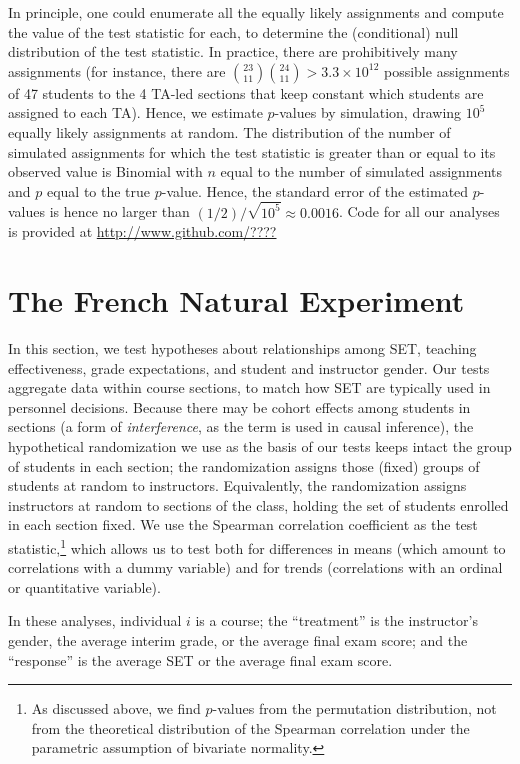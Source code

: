 \documentclass[12pt]{article}
\newcommand{\todo}[1]{{\color{red}{TO DO: \sc #1}}}
\begin{document}
In principle, one could enumerate all the equally likely assignments and compute the value
of the test statistic for each, to determine the (conditional) null distribution of the test
statistic.
In practice, there are prohibitively many assignments
(for instance, there are ${{23}\choose{11}}{{24}\choose{11}} > 3.3\times 10^{12}$ 
possible assignments
of 47 students to the 4 TA-led sections that keep constant which
students are assigned to each TA).
Hence, we estimate $p$-values by simulation, drawing $10^5$ equally likely assignments
at random.
The distribution of the number of simulated assignments for which the test statistic
is greater than or equal to its observed value is Binomial with $n$ equal to the number of
simulated assignments and $p$ equal to the true $p$-value.
Hence, the standard error of the estimated $p$-values is hence no larger than 
$(1/2)/ \sqrt{10^5}
\approx 0.0016$.
Code for all our analyses is provided at \url{http://www.github.com/????} \todo{Fix!}

\section{The French Natural Experiment}
In this section, we test hypotheses about relationships among
SET, teaching effectiveness, grade expectations, and student and instructor gender.
Our tests aggregate data within course sections, to match how SET are typically
used in personnel decisions. 
Because there may be cohort effects among students in sections (a form of
\emph{interference}, as the term is used in causal inference), the hypothetical randomization we
use as the basis of our tests keeps intact the group of students in each section;
the randomization assigns those (fixed) groups of students at random to instructors.
Equivalently, the randomization assigns instructors at random to sections of the class,
holding the set of students enrolled in each section fixed.
We use the Spearman correlation coefficient as the test statistic,\footnote{%
As discussed above, we find $p$-values from the permutation distribution, not from
the theoretical distribution of the Spearman correlation 
under the parametric assumption of bivariate normality.
} 
which allows us to test both for 
differences in means (which amount to correlations with a dummy variable) and for 
trends (correlations with an ordinal or quantitative variable).

In these analyses, individual $i$ is a course; the ``treatment'' is the instructor's gender, 
the average interim grade, or the average final exam score;
and the ``response'' is the average SET or the average final exam score.
\end{document}
